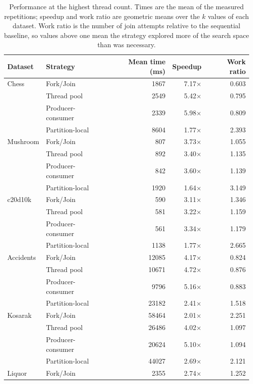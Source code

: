 \documentclass[pdflatex,sn-vancouver-num]{sn-jnl}
\theoremstyle{thmstyleone}%
\theoremstyle{thmstyletwo}%
\theoremstyle{thmstylethree}%
\begin{document}
\begin{table}[p]
\centering
\caption{Performance at the highest thread count. Times are the mean of the measured repetitions; speedup and work ratio are geometric means over the $k$ values of each dataset. Work ratio is the number of join attempts relative to the sequential baseline, so values above one mean the strategy explored more of the search space than was necessary.}
\label{tab:main}
\begin{tabular}{llrrr}
\toprule
Dataset & Strategy & Mean time (ms) & Speedup & Work ratio \\
\midrule
Chess & Fork/Join & 1867 & 7.17$\times$ & 0.603 \\
 & Thread pool & 2549 & 5.42$\times$ & 0.795 \\
 & Producer-consumer & 2339 & 5.98$\times$ & 0.809 \\
 & Partition-local & 8604 & 1.77$\times$ & 2.393 \\
\addlinespace
Mushroom & Fork/Join & 807 & 3.73$\times$ & 1.055 \\
 & Thread pool & 892 & 3.40$\times$ & 1.135 \\
 & Producer-consumer & 842 & 3.60$\times$ & 1.139 \\
 & Partition-local & 1920 & 1.64$\times$ & 3.149 \\
\addlinespace
c20d10k & Fork/Join & 590 & 3.11$\times$ & 1.346 \\
 & Thread pool & 581 & 3.22$\times$ & 1.159 \\
 & Producer-consumer & 561 & 3.34$\times$ & 1.179 \\
 & Partition-local & 1138 & 1.77$\times$ & 2.665 \\
\addlinespace
Accidents & Fork/Join & 12085 & 4.17$\times$ & 0.824 \\
 & Thread pool & 10671 & 4.72$\times$ & 0.876 \\
 & Producer-consumer & 9796 & 5.16$\times$ & 0.883 \\
 & Partition-local & 23182 & 2.41$\times$ & 1.518 \\
\addlinespace
Kosarak & Fork/Join & 58464 & 2.01$\times$ & 2.251 \\
 & Thread pool & 26486 & 4.02$\times$ & 1.097 \\
 & Producer-consumer & 20624 & 5.10$\times$ & 1.094 \\
 & Partition-local & 44027 & 2.69$\times$ & 2.121 \\
\addlinespace
Liquor & Fork/Join & 2355 & 2.74$\times$ & 1.252 \\

\end{tabular}
\end{table}
\end{document}
